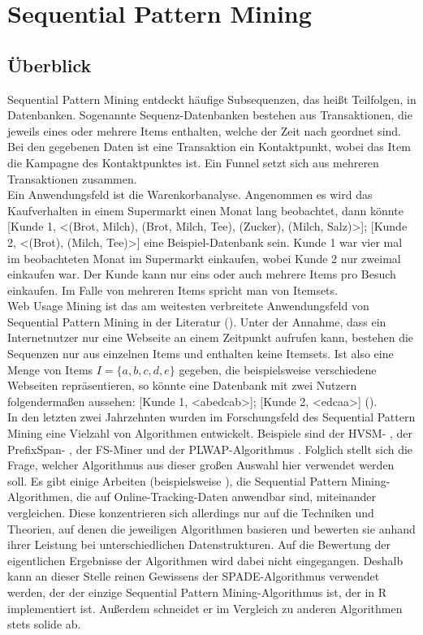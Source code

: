 \section{Sequential Pattern Mining}\label{spm}

\subsection{Überblick}

Sequential Pattern Mining entdeckt häufige Subsequenzen, das heißt Teilfolgen, in Datenbanken. Sogenannte Sequenz-Datenbanken bestehen aus Transaktionen, die jeweils eines oder mehrere Items enthalten, welche der Zeit nach geordnet sind. Bei den gegebenen Daten ist eine Transaktion ein Kontaktpunkt, wobei das Item die Kampagne des Kontaktpunktes ist. Ein Funnel setzt sich aus mehreren Transaktionen zusammen.\\
Ein Anwendungsfeld ist die Warenkorbanalyse. Angenommen es wird das Kaufverhalten in einem Supermarkt einen Monat lang beobachtet, dann könnte [Kunde 1, <(Brot, Milch), (Brot, Milch, Tee), (Zucker), (Milch, Salz)>]; [Kunde 2, <(Brot), (Milch, Tee)>] eine Beispiel-Datenbank sein. Kunde 1 war vier mal im beobachteten Monat im Supermarkt einkaufen, wobei Kunde 2 nur zweimal einkaufen war. Der Kunde kann nur eins oder auch mehrere Items pro Besuch einkaufen. Im Falle von mehreren Items spricht man von Itemsets.\\
Web Usage Mining ist das am weitesten verbreitete Anwendungsfeld von Sequential Pattern Mining in der Literatur (\cite{lu_ezeife,wang_han,goethals}). Unter der Annahme, dass ein Internetnutzer nur eine Webseite an einem Zeitpunkt aufrufen kann, bestehen die Sequenzen nur aus einzelnen Items und enthalten keine Itemsets. Ist also eine Menge von Items $I = \{a, b, c, d, e\}$ gegeben, die beispielsweise verschiedene Webseiten repräsentieren, so könnte eine Datenbank mit zwei Nutzern folgendermaßen aussehen: [Kunde 1, <abedcab>]; [Kunde 2, <edcaa>] (\cite{taxonomy}).\\
In den letzten zwei Jahrzehnten wurden im Forschungsfeld des Sequential Pattern Mining eine Vielzahl von Algorithmen entwickelt. Beispiele sind der HVSM- \cite{hvsm}, der PrefixSpan- \cite{prefixspan}, der FS-Miner \cite{fsminer} und der PLWAP-Algorithmus \cite{plwap}. Folglich stellt sich die Frage, welcher Algorithmus aus dieser großen Auswahl hier verwendet werden soll. Es gibt einige Arbeiten (beispielsweise \cite{spm_taxonomy1,spm_taxonomy2,spm_taxonomy3,spm_taxonomy4}), die Sequential Pattern Mining-Algorithmen, die auf Online-Tracking-Daten anwendbar sind, miteinander vergleichen. Diese konzentrieren sich allerdings nur auf die Techniken und Theorien, auf denen die jeweiligen Algorithmen basieren und bewerten sie anhand ihrer Leistung bei unterschiedlichen Datenstrukturen. Auf die Bewertung der eigentlichen Ergebnisse der Algorithmen wird dabei nicht eingegangen. Deshalb kann an dieser Stelle reinen Gewissens der SPADE-Algorithmus \cite{spade} verwendet werden, der der einzige Sequential Pattern Mining-Algorithmus ist, der in R implementiert ist. Außerdem schneidet er im Vergleich zu anderen Algorithmen stets solide ab.

